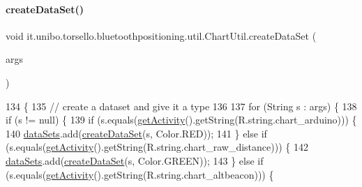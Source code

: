 \paragraph{\texorpdfstring{create\+Data\+Set()}{createDataSet()}\hspace{0.1cm}{\footnotesize\ttfamily [1/2]}}
{\footnotesize\ttfamily void it.\+unibo.\+torsello.\+bluetoothpositioning.\+util.\+Chart\+Util.\+create\+Data\+Set (\begin{DoxyParamCaption}\item[{Array\+List$<$ String $>$}]{args }\end{DoxyParamCaption})}


\begin{DoxyCode}
134                                                       \{
135         \textcolor{comment}{// create a dataset and give it a type}
136 
137         \textcolor{keywordflow}{for} (String s : args) \{
138             \textcolor{keywordflow}{if} (s != null) \{
139                 \textcolor{keywordflow}{if} (s.equals(\hyperlink{classit_1_1unibo_1_1torsello_1_1bluetoothpositioning_1_1util_1_1ChartUtil_a59150a6d20b6d0ad2fcf8c1ba858d355_a59150a6d20b6d0ad2fcf8c1ba858d355}{getActivity}().getString(R.string.chart\_arduino))) \{
140                     \hyperlink{classit_1_1unibo_1_1torsello_1_1bluetoothpositioning_1_1util_1_1ChartUtil_aa98bcaa2d5ba444b91cdc029768d380a_aa98bcaa2d5ba444b91cdc029768d380a}{dataSets}.add(\hyperlink{classit_1_1unibo_1_1torsello_1_1bluetoothpositioning_1_1util_1_1ChartUtil_a7460cb57f8ad402dc522b592bc40f7b2_a7460cb57f8ad402dc522b592bc40f7b2}{createDataSet}(s, Color.RED));
141                 \} \textcolor{keywordflow}{else} \textcolor{keywordflow}{if} (s.equals(\hyperlink{classit_1_1unibo_1_1torsello_1_1bluetoothpositioning_1_1util_1_1ChartUtil_a59150a6d20b6d0ad2fcf8c1ba858d355_a59150a6d20b6d0ad2fcf8c1ba858d355}{getActivity}().getString(R.string.chart\_raw\_distance))) \{
142                     \hyperlink{classit_1_1unibo_1_1torsello_1_1bluetoothpositioning_1_1util_1_1ChartUtil_aa98bcaa2d5ba444b91cdc029768d380a_aa98bcaa2d5ba444b91cdc029768d380a}{dataSets}.add(\hyperlink{classit_1_1unibo_1_1torsello_1_1bluetoothpositioning_1_1util_1_1ChartUtil_a7460cb57f8ad402dc522b592bc40f7b2_a7460cb57f8ad402dc522b592bc40f7b2}{createDataSet}(s, Color.GREEN));
143                 \} \textcolor{keywordflow}{else} \textcolor{keywordflow}{if} (s.equals(\hyperlink{classit_1_1unibo_1_1torsello_1_1bluetoothpositioning_1_1util_1_1ChartUtil_a59150a6d20b6d0ad2fcf8c1ba858d355_a59150a6d20b6d0ad2fcf8c1ba858d355}{getActivity}().getString(R.string.chart\_altbeacon))) \{

\end{DoxyCode}

